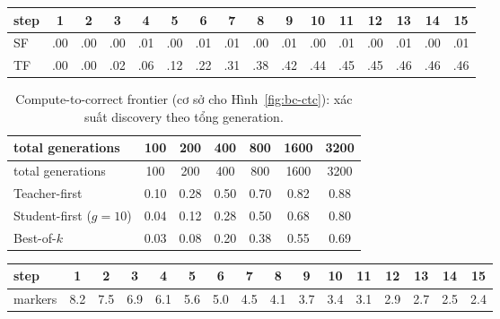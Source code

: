 \begin{center}\footnotesize\setlength{\tabcolsep}{3pt}
\begin{tabular}{lccccccccccccccc}
\toprule
step & 1 & 2 & 3 & 4 & 5 & 6 & 7 & 8 & 9 & 10 & 11 & 12 & 13 & 14 & 15 \\
\midrule
SF & .00 & .00 & .00 & .01 & .00 & .01 & .01 & .00 & .01 & .00 & .01 & .00 & .01 & .00 & .01 \\
TF & .00 & .00 & .02 & .06 & .12 & .22 & .31 & .38 & .42 & .44 & .45 & .45 & .46 & .46 & .46 \\
\bottomrule
\end{tabular}\par\end{center}

\begin{longtable}{lcccccc}
\caption{Compute-to-correct frontier (cơ sở cho Hình~\ref{fig:bc-ctc}): xác suất discovery theo tổng generation.}\\
\toprule
total generations & 100 & 200 & 400 & 800 & 1600 & 3200 \\
\midrule
\endfirsthead
\toprule
total generations & 100 & 200 & 400 & 800 & 1600 & 3200 \\
\midrule
\endhead
\bottomrule
\endfoot
Teacher-first & 0.10 & 0.28 & 0.50 & 0.70 & 0.82 & 0.88 \\
Student-first ($g{=}10$) & 0.04 & 0.12 & 0.28 & 0.50 & 0.68 & 0.80 \\
Best-of-$k$ & 0.03 & 0.08 & 0.20 & 0.38 & 0.55 & 0.69 \\
\end{longtable}

\begin{center}\footnotesize\setlength{\tabcolsep}{3pt}
\begin{tabular}{lccccccccccccccc}
\toprule
step & 1 & 2 & 3 & 4 & 5 & 6 & 7 & 8 & 9 & 10 & 11 & 12 & 13 & 14 & 15 \\
\midrule
markers & 8.2 & 7.5 & 6.9 & 6.1 & 5.6 & 5.0 & 4.5 & 4.1 & 3.7 & 3.4 & 3.1 & 2.9 & 2.7 & 2.5 & 2.4 \\
\bottomrule
\end{tabular}\par\end{center}
